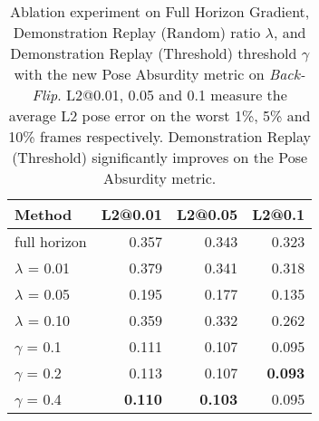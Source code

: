 \begin{table}[h]
\caption{ {Ablation experiment on Full Horizon Gradient, Demonstration Replay (Random) ratio $\lambda$, and Demonstration Replay (Threshold) threshold $\gamma$ with the new Pose Absurdity metric on \emph{Back-Flip}.  L2@0.01, 0.05 and 0.1 measure the average L2 pose error on the worst 1\%, 5\% and 10\% frames respectively. Demonstration Replay (Threshold) significantly improves on the Pose Absurdity metric.}}
\label{tab:metric}
\begin{center}
\begin{tabular}{l|rrr}
\toprule
Method & L2@0.01 & L2@0.05 & L2@0.1 \\
\midrule
full horizon & 0.357 & 0.343 & 0.323 \\
\midrule
$\lambda$ = 0.01 & 0.379 & 0.341 & 0.318 \\
$\lambda$ = 0.05 & 0.195 & 0.177 & 0.135 \\
$\lambda$ = 0.10 & 0.359 & 0.332 & 0.262 \\
\midrule
$\gamma$ = 0.1 & 0.111 & 0.107 & 0.095 \\
$\gamma$ = 0.2 & 0.113 & 0.107 & \textbf{0.093} \\
$\gamma$ = 0.4 & \textbf{0.110} & \textbf{0.103} & 0.095 \\
\bottomrule
\end{tabular}
\end{center}
\end{table}